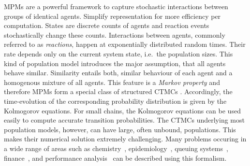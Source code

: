 \Acfp{MPM} are a powerful framework to capture stochastic interactions between groups of identical agents.
Simplify representation for more efficiency per computation.
States are discrete counts of agents and reaction events stochastically change these counts.
Interactions between agents, commonly referred to as \emph{reactions}, happen at exponentially distributed random times. 
Their rate depends only on the current system state, i.e.\ the population sizes.
This kind of population model introduces the major assumption, that all agents behave similar.
Similarity entails both, similar behaviour of each agent and a homogenous mixture of all agents.
This feature is a \emph{Markov property} and
therefore \acp{MPM} form a special class of structured \acp{CTMC} \parencite{anderson2012continuous}.
Accordingly, the time-evolution of the corresponding probability distribution is 
given by the Kolmogorov equations.
For small chains, the Kolmogorov equations can be used easily to compute accurate transition probabilities.
The \acp{CTMC} underlying most population models, however, can have large, often unbound, populations.
This makes their numerical solution extremely challenging.
Many problems occuring in a wide range of areas such as chemistry~\parencite{gillespie1977exact}, epidemiology~\parencite{mode2000stochastic},    queuing systems~\parencite{breuer2003markov}, finance~\parencite{pardoux2008markov}, and performance analysis~\parencite{bortolussi2013continuous,gast2019} can be described using this formalism.

